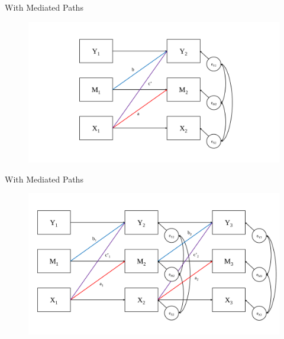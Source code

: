 \documentclass{beamer}
\begin{document}
\begin{frame}{With Mediated Paths}

  \begin{figure}
    \includegraphics[width=\textwidth]{figures/twoWaveStructure2.pdf}
  \end{figure}

\end{frame}



\begin{frame}{With Mediated Paths}

  \begin{figure}
    \includegraphics[width=\textwidth]{figures/threeWaveStructure2.pdf}
  \end{figure}

\end{frame}
\end{document}
